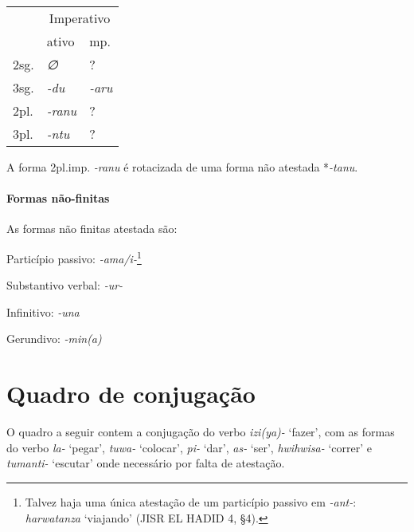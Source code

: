 \begin{center}
	\begin{tabular}[c]{lll}
		\toprule
		     & \multicolumn{2}{c}{Imperativo}               \\
		     & ativo                          & mp.         \\
		\midrule
		2sg. & \emph{∅}                       & {?}         \\
		3sg. & \emph{-du}                     & \emph{-aru} \\
		\midrule
		2pl. & \emph{-ranu}                   & {?}         \\
		3pl. & \emph{-ntu}                    & {?}         \\
		\bottomrule
	\end{tabular}
\end{center}

\noindent A forma 2pl.imp. \emph{-ranu} é rotacizada de uma forma não atestada
*\emph{-tanu}.

\paragraph{Formas não-finitas}
As formas não finitas atestada são:

\begin{compactitem}
	\item Particípio passivo: \emph{-ama\slash{}i-}\footnote{Talvez haja uma única
		atestação de um particípio passivo em \emph{-ant-}: \emph{harwatanza}
		`viajando' (JISR EL HADID 4, §4).}
	\item Substantivo verbal: \emph{-ur-}
	\item Infinitivo: \emph{-una}
	\item Gerundivo: \emph{-min{(a)}}
\end{compactitem}



\section{Quadro de conjugação}

O quadro a seguir contem a conjugação do verbo \emph{izi(ya)-} `fazer', com as
formas do verbo \emph{la-} `pegar', \emph{tuwa-} `colocar',
\emph{pi-} `dar', \emph{as-} `ser', \emph{hwihwisa-}
`correr' e \emph{tumanti-} `escutar' onde necessário por falta de atestação.

